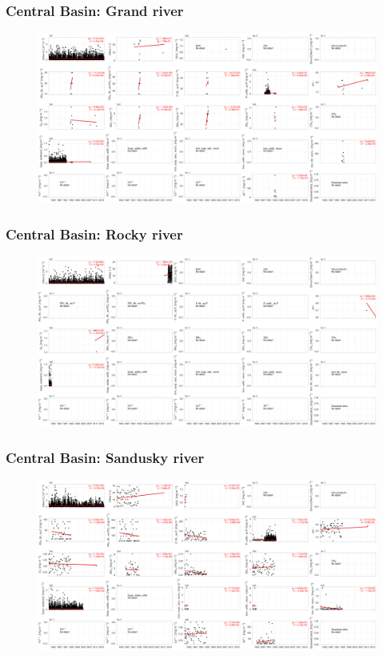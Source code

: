 \documentclass{beamer}
\begin{document}
\begin{frame}
\frametitle{Central Basin: Grand river}
\begin{figure}
\includegraphics[width=\textwidth]{rivers/Central basin/plot_all grandriver.png}
\end{figure}
\end{frame}

\begin{frame}
\frametitle{Central Basin: Rocky river}
\begin{figure}
\includegraphics[width=\textwidth]{rivers/Central basin/plot_all rockyriver.png}
\end{figure}
\end{frame}

\begin{frame}
\frametitle{Central Basin: Sandusky river}
\begin{figure}
\includegraphics[width=\textwidth]{rivers/Central basin/plot_all sanduskyriver.png}
\end{figure}
\end{frame}
\end{document}

